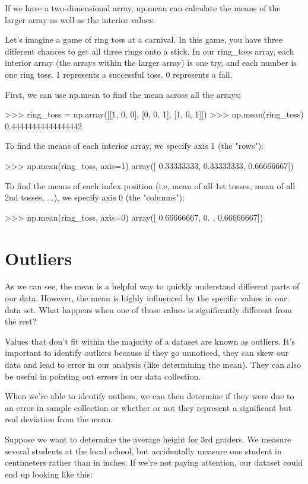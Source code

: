 \documentclass{journal}
\begin{document}
If we have a two-dimensional array, np.mean can calculate the means of the larger array as well as the interior values.

Let's imagine a game of ring toss at a carnival. In this game, you have three different chances to get all three rings onto a stick. In our ring_toss array, each interior array (the arrays within the larger array) is one try, and each number is one ring toss. 1 represents a successful toss, 0 represents a fail.

First, we can use np.mean to find the mean across all the arrays:

>>> ring_toss = np.array([[1, 0, 0], 
                          [0, 0, 1], 
                          [1, 0, 1]])
>>> np.mean(ring_toss)
0.44444444444444442

To find the means of each interior array, we specify axis 1 (the "rows"):

>>> np.mean(ring_toss, axis=1)
array([ 0.33333333,  0.33333333,  0.66666667])

To find the means of each index position (i.e, mean of all 1st tosses, mean of all 2nd tosses, ...), we specify axis 0 (the "columns"):

>>> np.mean(ring_toss, axis=0)
array([ 0.66666667,  0.        ,  0.66666667])


\section{Outliers}
As we can see, the mean is a helpful way to quickly understand different parts of our data. However, the mean is highly influenced by the specific values in our data set. What happens when one of those values is significantly different from the rest?

Values that don’t fit within the majority of a dataset are known as outliers. It’s important to identify outliers because if they go unnoticed, they can skew our data and lead to error in our analysis (like determining the mean). They can also be useful in pointing out errors in our data collection.

When we're able to identify outliers, we can then determine if they were due to an error in sample collection or whether or not they represent a significant but real deviation from the mean.

Suppose we want to determine the average height for 3rd graders. We measure several students at the local school, but accidentally measure one student in centimeters rather than in inches. If we're not paying attention, our dataset could end up looking like this:
\end{document}

